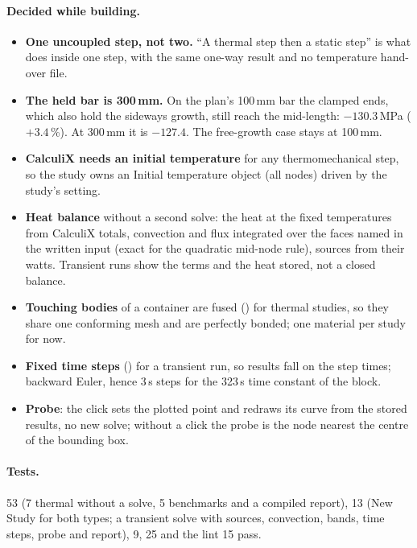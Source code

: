 \paragraph{Decided while building.}
\begin{itemize}[nosep]
  \item \textbf{One uncoupled step, not two.} ``A thermal step then a static step'' is what 
        does inside one step, with the same one-way result and no temperature hand-over file.
  \item \textbf{The held bar is 300\,mm.} On the plan's 100\,mm bar the clamped ends, which also hold the sideways growth, still
        reach the mid-length: $-130.3$\,MPa ($+3.4$\,\%). At 300\,mm it is $-127.4$. The free-growth case stays at 100\,mm.
  \item \textbf{CalculiX needs an initial temperature} for any thermomechanical step, so the study owns an Initial temperature
        object (all nodes) driven by the study's setting.
  \item \textbf{Heat balance} without a second solve: the heat at the fixed temperatures from CalculiX 
        totals, convection and flux integrated over the faces named in the written input (exact for the quadratic mid-node
        rule), sources from their watts. Transient runs show the terms and the heat stored, not a closed balance.
  \item \textbf{Touching bodies} of a container are fused () for thermal studies, so they share one
        conforming mesh and are perfectly bonded; one material per study for now.
  \item \textbf{Fixed time steps} () for a transient run, so results fall on the step times; backward Euler,
        hence 3\,s steps for the 323\,s time constant of the block.
  \item \textbf{Probe}: the click sets the plotted point and redraws its curve from the stored results, no new solve; without
        a click the probe is the node nearest the centre of the bounding box.
\end{itemize}

\paragraph{Tests.}  53 (7 thermal without a solve, 5 benchmarks and a compiled report),
 13 (New Study for both types; a transient solve with sources, convection, bands, time steps,
probe and report),  9,  25 and the lint  15 pass.

